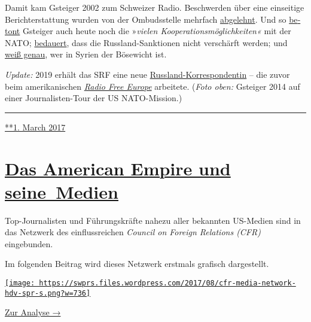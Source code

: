 Damit kam Gsteiger 2002 zum Schweizer Radio. Be­schwer­den über eine
ein­sei­tige Be­richt­er­stattung wurden von der Ombuds­stelle mehr­fach
\href{https://www.srgd.ch/de/aktuelles/news/2016/09/28/sendung-info-3-auf-radio-srf-3-uber-waffenruhe-syrien-beanstandet/}{abge­lehnt}.
Und so
\href{http://www.swissinfo.ch/ger/kooperation_die-nato-umwirbt-die-schweiz/42225918}{be­tont}
Gsteiger auch heute noch die »\emph{vielen
Koope­ra­tions­möglich­keiten«} mit der NATO;
\href{http://www.srf.ch/news/international/dieser-eu-rueckzieher-ist-peinlich}{be­dauert},
dass die Russ­land-Sanktionen nicht ver­schärft werden; und
\href{http://www.srf.ch/news/international/assad-kommt-mit-giftgaseinsaetzen-vorlaeufig-davon}{weiß
genau}, wer in Syrien der Böse­wicht ist.

\emph{Update:} 2019 erhält das SRF eine neue
\href{https://www.srgd.ch/de/aktuelles/news/2017/12/05/luzia-tschirky-wird-neue-russland-korrespondentin/}{Russland-Korrespondentin}
-- die zuvor beim amerikanischen
\href{https://de.wikipedia.org/wiki/Radio_Free_Europe}{\emph{Radio Free
Europe}} arbeitete. (\emph{Foto oben:} Gsteiger 2014 auf einer
Jour­na­­listen-​Tour der US NATO-Mission.)

\begin{center}\rule{0.5\linewidth}{\linethickness}\end{center}

\href{https://swprs.org/2017/03/01/der-korrespondent/}{**1. March 2017}

\hypertarget{das-american-empire-und-seine-medien}{%
\section{\texorpdfstring{\href{https://swprs.org/2017/03/01/netzwerk-medien-usa/}{Das
American Empire und
seine~Medien}}{Das American Empire und seine~Medien}}\label{das-american-empire-und-seine-medien}}

Top-Journalisten und Führungskräfte nahezu aller bekannten US-Medien
sind in das Netz­werk des einflussreichen \emph{Council on Foreign
Relations (CFR)} eingebunden.

Im folgenden Beitrag wird dieses Netzwerk erstmals grafisch
dar­ge­stellt.

\href{https://swprs.org/das-american-empire-und-seine-medien/}{\texttt{[image: https://swprs.files.wordpress.com/2017/08/cfr-media-network-hdv-spr-s.png?w=736]}}

\href{https://swprs.org/das-american-empire-und-seine-medien/}{Zur
Analyse →}

